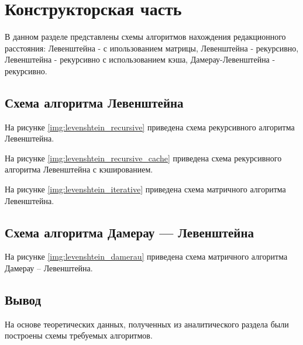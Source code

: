\chapter{Конструкторская часть}

В данном разделе представлены схемы алгоритмов нахождения
редакционного расстояния: Левенштейна - с ипользованием матрицы,
Левенштейна - рекурсивно, Левенштейна - рекурсивно с использованием
кэша, Дамерау-Левенштейна - рекурсивно.

\section{Схема алгоритма Левенштейна}

На рисунке \ref{img:levenshtein_recursive} приведена схема рекурсивного алгоритма Левенштейна.

На рисунке \ref{img:levenshtein_recursive_cache} приведена схема рекурсивного алгоритма Левенштейна с кэшированием.

На рисунке \ref{img:levenshtein_iterative} приведена схема матричного алгоритма Левенштейна.






\section{Схема алгоритма Дамерау — Левенштейна}

На рисунке \ref{img:levenshtein_damerau} приведена схема матричного алгоритма Дамерау -- Левенштейна.


\pagebreak\section*{Вывод}

На основе теоретических данных, полученных из аналитического раздела были построены схемы требуемых алгоритмов.